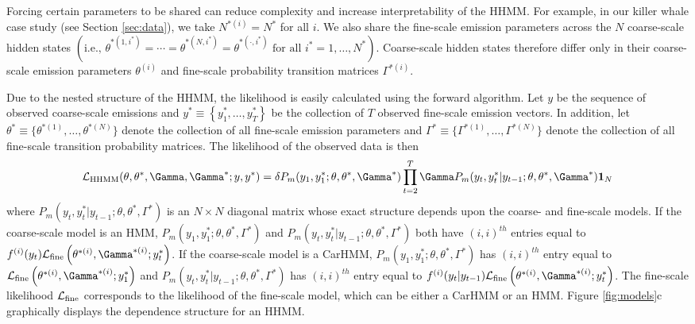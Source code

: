 Forcing certain parameters to be shared can reduce complexity and increase interpretability of the HHMM. For example, in our killer whale case study (see Section \ref{sec:data}), we take $N^{*(i)} = N^*$ for all $i$. We also share the fine-scale emission parameters across the $N$ coarse-scale hidden states $\left( \text{i.e., } \theta^{*(1,i^*)} = \cdots = \theta^{*(N,i^*)} = \theta^{*(\cdot,i^*)} \text{ for all } i^* = 1, \ldots, N^* \right)$. Coarse-scale hidden states therefore differ only in their coarse-scale emission parameters $\theta^{(i)}$ and fine-scale probability transition matrices $\Gamma^{*(i)}$.

Due to the nested structure of the HHMM, the likelihood is easily calculated using the forward algorithm.
%
Let $y$ be the sequence of observed coarse-scale emissions and
$y^* \equiv \left\{y^*_1, \ldots,y^*_T\right\}$ be the collection of $T$ observed fine-scale emission vectors.
%
In addition, let $\theta^* \equiv \{\theta^{*(1)}, \ldots, \theta^{*(N)}\}$ denote the collection of all fine-scale emission parameters and $\Gamma^* \equiv \{\Gamma^{*(1)}, \ldots, \Gamma^{*(N)}\}$ denote the collection of all fine-scale transition probability matrices. The likelihood of the observed data is then
%
\begin{equation}
    \calL_{\text{HHMM}}(\theta,\theta^*,\Gamma,\Gamma^*;y,y^*) = \delta P_m(y_1,y_1^*;\theta,\theta^*,\Gamma^*) \prod_{t=2}^T \Gamma P_m(y_t,y_t^*|y_{t-1};\theta,\theta^*,\Gamma^*) \mathbf{1}_N
    \label{eqn:HHMM_likelihood}
\end{equation}
%
where $P_m(y_t,y_t^*|y_{t-1};\theta,\theta^*,\Gamma^*)$ is an $N \times N$ diagonal matrix whose exact structure depends upon the coarse- and fine-scale models. If the coarse-scale model is an HMM, $P_m(y_1,y_1^*;\theta,\theta^*,\Gamma^*)$ and $P_m(y_t,y_t^*|y_{t-1};\theta,\theta^*,\Gamma^*)$ both have $(i,i)^{th}$ entries equal to 
$f^{(i)}(y_t)\calL_{\text{fine}}\left(\theta^{*(i)},
\Gamma^{*(i)};y_t^*\right)$. 
If the coarse-scale model is a CarHMM, $P_m(y_1,y_1^*;\theta,\theta^*,\Gamma^*)$ has $(i,i)^{th}$ entry equal to $\calL_{\text{fine}}\left(\theta^{*(i)},
\Gamma^{*(i)};y_1^*\right)$ and $P_m(y_t,y_t^*|y_{t-1};\theta,\theta^*,\Gamma^*)$ has $(i,i)^{th}$ entry equal to $f^{(i)}(y_t|y_{t-1})\calL_{\text{fine}}\left(\theta^{*(i)},
\Gamma^{*(i)};y_t^*\right)$.
The fine-scale likelihood $\mathcal{L}_{\text{fine}}$ corresponds to the likelihood of the fine-scale model, which can be either a CarHMM or an HMM. Figure \ref{fig:models}c graphically displays the dependence structure for an HHMM.
%

